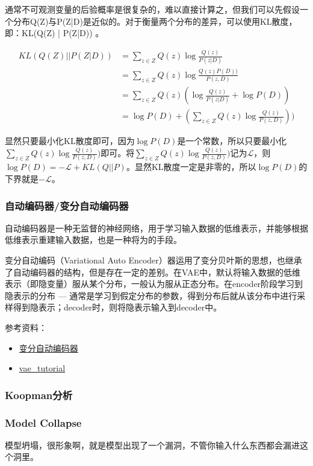 通常不可观测变量的后验概率是很复杂的，难以直接计算之，但我们可以先假设一个分布Q(Z)与P(Z|D)是近似的。对于衡量两个分布的差异，可以使用KL散度，即：KL(Q(Z) | P(Z|D)) 。

$$
\begin{equation}\nonumber
	\begin{aligned}
		KL(Q(Z) || P(Z|D)) &= \sum_{z \in Z} Q(z) \log \frac{Q(z)}{P(z|D)} \\
		&= \sum_{z \in Z} Q(z) \log \frac{Q(z) P(D) )}{P(z, D) } \\	
		&= \sum_{z \in Z} Q(z) ( \log \frac{Q(z)}{P(z|D)} + \log P(D) ) \\
		&= \log P(D) + ( \sum_{z \in Z} Q(z) \log \frac{Q(z)}{P(z, D)}) ) 
	\end{aligned}
\end{equation}
$$

显然只要最小化KL散度即可，因为$\log P(D)$是一个常数，所以只要最小化$\sum_{z \in Z} Q(z) \log \frac{Q(z)}{P(z, D)})$即可。将$\sum_{z \in Z} Q(z) \log \frac{Q(z)}{P(z, D)})$记为$\mathcal{L}$，则$\log P(D) = -\mathcal{L} + KL(Q || P)$。显然KL散度一定是非零的，所以$\log P(D)$的下界就是$-\mathcal{L}$。


\subsubsection{自动编码器/变分自动编码器}
自动编码器是一种无监督的神经网络，用于学习输入数据的低维表示，并能够根据低维表示重建输入数据，也是一种将为的手段。

变分自动编码（Variational Auto Encoder）器运用了变分贝叶斯的思想，也继承了自动编码器的结构，但是存在一定的差别。在VAE中，默认将输入数据的低维表示（即隐变量）服从某个分布，一般认为服从正态分布。在encoder阶段学习到隐表示的分布 --- 通常是学习到假定分布的参数，得到分布后就从该分布中进行采样得到隐表示；decoder时，则将隐表示输入到decoder中。

参考资料：
\begin{itemize}
	\item \href{https://www.cnblogs.com/kexinxin/p/9858525.html}{变分自动编码器}
	\item \href{https://github.com/cdoersch/vae_tutorial}{vae\_tutorial}
\end{itemize}

\subsubsection{Koopman分析}


\subsubsection{Model Collapse}
模型坍塌，很形象啊，就是模型出现了一个漏洞，不管你输入什么东西都会漏进这个洞里。

